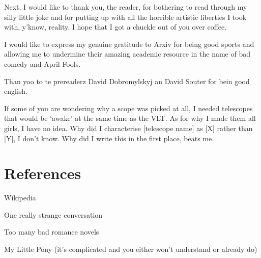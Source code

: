 \documentclass[12pt]{iopart}
\begin{document}
Next, I would like to thank you, the reader, for bothering to read through my silly little joke and for putting up with all the horrible artistic liberties I took with, y'know, reality. I hope that I got a chuckle out of you over coffee.

I would like to express my genuine gratitude to Arxiv for being good sports and allowing me to undermine their amazing academic resource in the name of bad comedy and April Fools.

Than yoo to te prereaderz David Dobromylskyj an David Souter for bein good english.

If some of you are wondering why a scope was picked at all, I needed telescopes that would be `awake' at the same time as the VLT. As for why I made them all girls, I have no idea. Why did I characterise [telescope name] as [X] rather than [Y], I don't know. Why did I write this in the first place, beats me.

\section{References}
Wikipedia

One really strange conversation

Too many bad romance novels

My Little Pony (it's complicated and you either won't understand or already do)
\end{document}

